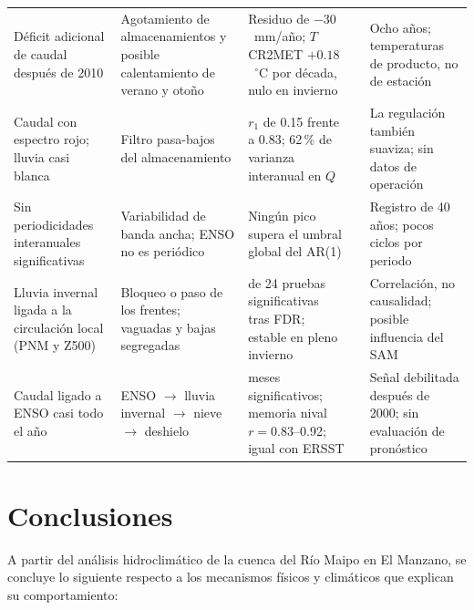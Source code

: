 \documentclass[11pt,a4paper]{article}
\newcommand{\Qm}{Q}
\begin{document}
\begin{table}[H]
\begin{tabularx}{\textwidth}{>{\raggedright\arraybackslash}p{2.6cm}>{\raggedright\arraybackslash}X>{\raggedright\arraybackslash}X>{\raggedright\arraybackslash}p{2.0cm}>{\raggedright\arraybackslash}X}
Déficit adicional de caudal después de 2010 & Agotamiento de almacenamientos y posible calentamiento de verano y otoño & Residuo de $-30$~mm/año; $T$ CR2MET $+0.18$~$^\circ$C por década, nulo en invierno & \citep{AlvarezGarreton2021,Falvey2009} & Ocho años; temperaturas de producto, no de estación \\
Caudal con espectro rojo; lluvia casi blanca & Filtro pasa-bajos del almacenamiento & $r_1$ de 0.15 frente a 0.83; 62\,\% de varianza interanual en $\Qm$ & \citep{Gilman1963,Torrence1998} & La regulación también suaviza; sin datos de operación \\
Sin periodicidades interanuales significativas & Variabilidad de banda ancha; ENSO no es periódico & Ningún pico supera el umbral global del AR(1) & \citep{Trenberth1997} & Registro de 40 años; pocos ciclos por periodo \\
Lluvia invernal ligada a la circulación local (PNM y Z500) & Bloqueo o paso de los frentes; vaguadas y bajas segregadas & 16 de 24 pruebas significativas tras FDR; estable en pleno invierno & \citep{Garreaud2009,Montecinos2003} & Correlación, no causalidad; posible influencia del SAM \\
Caudal ligado a ENSO casi todo el año & ENSO $\rightarrow$ lluvia invernal $\rightarrow$ nieve $\rightarrow$ deshielo & 8 meses significativos; memoria nival $r=0.83$--0.92; igual con ERSST & \citep{Montecinos2003,Rutllant1991,Cortes2017} & Señal debilitada después de 2000; sin evaluación de pronóstico \\
\bottomrule
\end{tabularx}
\end{table}

\section{Conclusiones}
\label{sec:conclusiones}

A partir del análisis hidroclimático de la cuenca del Río Maipo en El Manzano, se concluye lo siguiente respecto a los mecanismos físicos y climáticos que explican su comportamiento:
\end{document}
